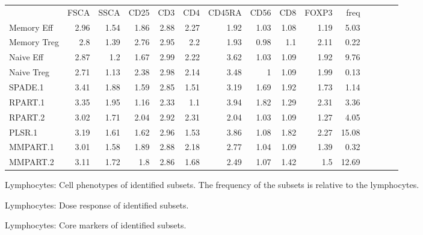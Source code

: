 \begin{table}[h]\footnotesize
\centering
\begin{tabular}{lrrrrrrrrrrrrrr}
\rowcolor{Gray}
            & FSCA & SSCA & CD25 & CD3  & CD4  & CD45RA & CD56 & CD8  & FOXP3 & freq \\
Memory Eff  & 2.96 & 1.54 & 1.86 & 2.88 & 2.27 & 1.92 & 1.03 & 1.08 & 1.19 & 5.03 \\
Memory Treg & 2.8  & 1.39 & 2.76 & 2.95 & 2.2  & 1.93 & 0.98 & 1.1  & 2.11 & 0.22 \\
Naive Eff   & 2.87 & 1.2  & 1.67 & 2.99 & 2.22 & 3.62 & 1.03 & 1.09 & 1.92 & 9.76 \\
Naive Treg  & 2.71 & 1.13 & 2.38 & 2.98 & 2.14 & 3.48 & 1    & 1.09 & 1.99 & 0.13 \\
\hline
SPADE.1     & 3.41 & 1.88 & 1.59 & 2.85 & 1.51 & 3.19 & 1.69 & 1.92 & 1.73 & 1.14 \\
RPART.1     & 3.35 & 1.95 & 1.16 & 2.33 & 1.1  & 3.94 & 1.82 & 1.29 & 2.31 & 3.36 \\
RPART.2     & 3.02 & 1.71 & 2.04 & 2.92 & 2.31 & 2.04 & 1.03 & 1.09 & 1.27 & 4.05 \\
PLSR.1      & 3.19 & 1.61 & 1.62 & 2.96 & 1.53 & 3.86 & 1.08 & 1.82 & 2.27 & 15.08 \\
MMPART.1    & 3.01 & 1.58 & 1.89 & 2.88 & 2.18 & 2.77 & 1.04 & 1.09 & 1.39 & 0.32 \\
MMPART.2    & 3.11 & 1.72 & 1.8  & 2.86 & 1.68 & 2.49 & 1.07 & 1.42 & 1.5  & 12.69 \\
\end{tabular}
{ Lymphocytes: Cell phenotypes of identified subsets. }
{ The frequency of the subsets is relative to the lymphocytes. }
\end{table}

{ Lymphocytes: Dose response of identified subsets. }
{ }


{ Lymphocytes: Core markers of identified subsets. }
{ }




\clearpage


